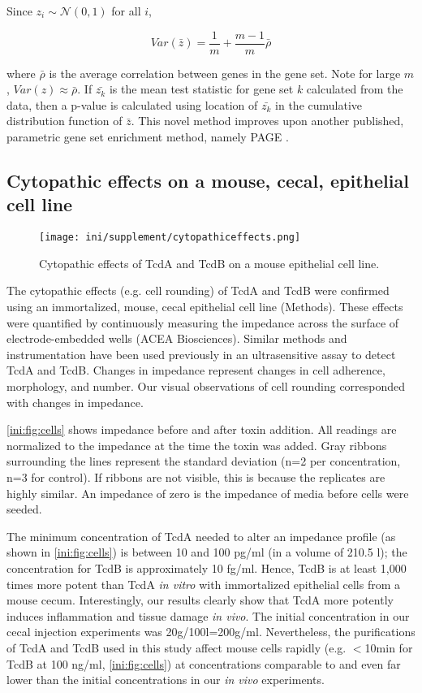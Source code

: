 Since $z_i \sim \mathcal{N}(0,1)$ for all $i$,

\begin{equation}
Var( \bar{z} ) = \frac{1}{m}  + \frac{m-1}{m}\bar{\rho}
\end{equation}

where $\bar{\rho}$ is the average correlation between genes in the gene set. Note for
large $m$, $Var(z) \approx \bar{\rho}$. If $\bar{z_k}$ is the 
mean test statistic for gene set $k$ calculated from the data, then a p-value
is calculated using location of $\bar{z_k}$ in the cumulative distribution 
function of $\bar{z}$. This novel method improves upon another published, parametric gene
set enrichment method, namely PAGE \cite{Kim:2005fw}.


\subsection{Cytopathic effects on a mouse, cecal, epithelial cell line}

\begin{figure}[b!]
\centering
\texttt{[image: ini/supplement/cytopathiceffects.png]}
\caption{Cytopathic effects of TcdA and TcdB on a mouse epithelial cell line.}
\label{ini:fig:cells}
\end{figure}

The cytopathic effects (e.g. cell rounding) of TcdA and TcdB were confirmed using an
immortalized, mouse, cecal epithelial cell line (Methods). These effects
were quantified by continuously measuring the impedance across the surface
of electrode-embedded wells (ACEA Biosciences). Similar methods and instrumentation
have been used previously in an ultrasensitive assay to detect TcdA and TcdB. \cite{He:2009hg} 
Changes in impedance represent changes in
cell adherence, morphology, and number. Our visual observations of cell rounding
corresponded with changes in impedance. 

\autoref{ini:fig:cells} shows impedance before and after toxin
addition. All readings are normalized to the impedance
at the time the toxin was added. Gray ribbons surrounding the lines represent
the standard deviation (n=2 per concentration, n=3 for control). If ribbons are not visible, 
this is because the replicates are highly similar. An impedance of zero
is the impedance of media before cells were seeded.

The minimum concentration of 
TcdA needed to alter an impedance profile (as shown in \autoref{ini:fig:cells}) is
between 10 and 100 pg/ml (in a volume of 210.5 \textmugreek{}l); the concentration for TcdB is 
approximately 10 fg/ml. 
Hence, TcdB is at least 1,000 times more potent than TcdA
\emph{in vitro} with immortalized epithelial cells from a mouse cecum. Interestingly, our results
clearly show that TcdA more potently induces inflammation and
tissue damage \emph{in vivo}. 
The initial concentration in our cecal injection experiments was 
20\textmugreek{}g/100\textmugreek{}l=200\textmugreek{}g/ml. 
Nevertheless, the purifications of TcdA and TcdB used
in this study affect mouse cells rapidly (e.g. $<$10min for TcdB at 100 ng/ml, 
\autoref{ini:fig:cells}) at concentrations comparable to and even far lower than 
the initial concentrations in our \emph{in vivo} experiments.


